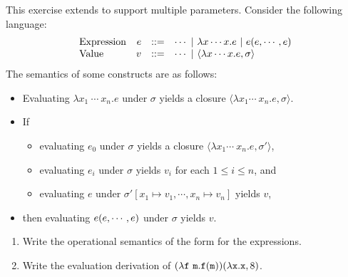 \begin{exercise}

This exercise extends \lang to support multiple parameters.
Consider the following language:
\[
\begin{array}{lrrl}
  \text{Expression}& e & ::= & \cdots\ |\ \lambda x\cdots x.e\ |\
  e(e,\cdots,e)\\
  \text{Value}& v & ::= & \cdots\ |\ \langle\lambda x\cdots x.e,\sigma\rangle \\
\end{array}
\]
The semantics of some constructs are as follows:
\begin{itemize}
  \item Evaluating $\lambda x_1\ \cdots\ x_n. e$ under $\sigma$
      yields a closure $\langle \lambda x_1 \cdots\ x_n.e,\sigma \rangle$.
  \item If
    \begin{itemize}
    \item evaluating $e_0$ under $\sigma$ yields a closure $\langle \lambda x_1
      \cdots\ x_n.e,\sigma' \rangle$,
    \item evaluating $e_i$ under $\sigma$ yields $v_i$ for each $1 \leq i \leq
      n$, and
    \item evaluating $e$ under $\sigma'[x_1 \mapsto v_1, \cdots, x_n \mapsto
      v_n]$ yields $v$,
    \end{itemize}
\item[] then evaluating $e(e,\cdots,e)$ under $\sigma$ yields $v$.
\end{itemize}

\begin{enumerate}
  \item Write the operational semantics of the form  for the expressions.
  \item Write the evaluation derivation of
    $(\lambda\texttt{f}\
    \texttt{m}.\texttt{f}(\texttt{m}))(\lambda\texttt{x}.\texttt{x},8)$.
\end{enumerate}

\end{exercise}

